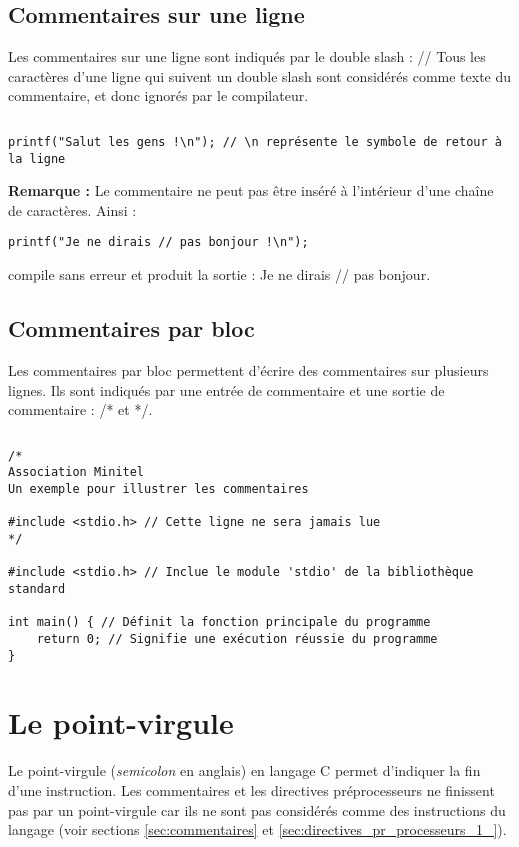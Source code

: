 \documentclass[../../../main.tex]{subfiles}
\begin{document}
\subsection{Commentaires sur une ligne}\label{sub:commentaires_sur_une_ligne}
Les commentaires sur une ligne sont indiqués par le double slash : \textsf{//} \newline
Tous les caractères d'une ligne qui suivent un double slash sont considérés comme texte du commentaire, et donc ignorés par le compilateur.
\begin{lstlisting}[title=Exemple]
\end{lstlisting}
\begin{verbatim}
printf("Salut les gens !\n"); // \n représente le symbole de retour à la ligne
\end{verbatim}
\textbf{Remarque :} Le commentaire ne peut pas être inséré à l'intérieur d'une chaîne de caractères. Ainsi :
\begin{verbatim}
printf("Je ne dirais // pas bonjour !\n");
\end{verbatim}
compile sans erreur et produit la sortie : \textsf{Je ne dirais // pas bonjour}.
\subsection{Commentaires par bloc}\label{sub:commentaires_par_bloc}
Les commentaires par bloc permettent d'écrire des commentaires sur plusieurs lignes. Ils sont indiqués par une entrée de commentaire et une sortie de commentaire : \textsf{/*} et \textsf{*/}.
\begin{lstlisting}[title=Exemple]
\end{lstlisting}
\begin{verbatim}
/*
Association Minitel
Un exemple pour illustrer les commentaires

#include <stdio.h> // Cette ligne ne sera jamais lue
*/

#include <stdio.h> // Inclue le module 'stdio' de la bibliothèque standard

int main() { // Définit la fonction principale du programme
	return 0; // Signifie une exécution réussie du programme
}
\end{verbatim}
\newpage
\section{Le point-virgule}\label{sec:le_point_virgule}
Le point-virgule (\textit{semicolon} en anglais) en langage C permet d'indiquer la fin d'une instruction. Les commentaires et les directives préprocesseurs ne finissent pas par un point-virgule car ils ne sont pas considérés comme des instructions du langage (voir sections \ref{sec:commentaires} et \ref{sec:directives_pr_processeurs_1_}).
 
\end{document}
